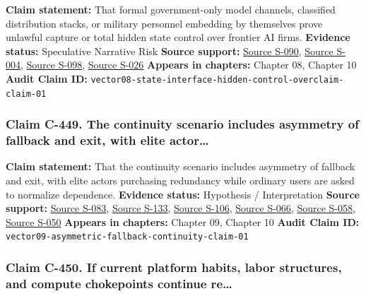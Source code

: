 \documentclass[
  american,
  11pt,
  letterpaper,
]{article}
\begin{document}
\textbf{Claim statement:} That formal government-only model channels,
classified distribution stacks, or military personnel embedding by
themselves prove unlawful capture or total hidden state control over
frontier AI firms. \textbf{Evidence status:} Speculative Narrative Risk
\textbf{Source support:}
\hyperref[source-s-090-introducing-openai-for-government]{Source S-090},
\hyperref[source-s-004-claude-gov-models-for-u-s-national-security-customers]{Source
S-004},
\hyperref[source-s-098-anthropic-and-palantir-partner-to-bring-claude-ai-models-to-aws-for-u-s-government-intelligence-and-defense-operations]{Source
S-098},
\hyperref[source-s-026-army-launches-detachment-201-executive-innovation-corps-to-drive-tech-transformation]{Source
S-026} \textbf{Appears in chapters:} Chapter 08, Chapter 10
\textbf{Audit Claim ID:}
\texttt{vector08-state-interface-hidden-control-overclaim-claim-01}

\subsubsection{Claim C-449. The continuity scenario includes asymmetry
of fallback and exit, with elite
actor\ldots{}}\label{claim-c-449-the-continuity-scenario-includes-asymmetry-of-fallback-and-exit-with-elite-actor}

\textbf{Claim statement:} That the continuity scenario includes
asymmetry of fallback and exit, with elite actors purchasing redundancy
while ordinary users are asked to normalize dependence. \textbf{Evidence
status:} Hypothesis / Interpretation \textbf{Source support:}
\hyperref[source-s-083-sam-altman-s-manifest-destiny]{Source S-083},
\hyperref[source-s-133-inside-mark-zuckerbergs-top-secret-hawaii-compound]{Source
S-133},
\hyperref[source-s-106-mark-zuckerberg-downplays-his-5-000-square-foot-underground-bunker-in-hawaii-just-a-little-shelter]{Source
S-106},
\hyperref[source-s-066-why-silicon-valley-billionaires-are-prepping-for-the-apocalypse-in-new-zealand]{Source
S-066},
\hyperref[source-s-058-new-zealand-woos-the-wealthy-with-golden-visa-changes]{Source
S-058},
\hyperref[source-s-050-the-digital-sovereignty-imperative]{Source S-050}
\textbf{Appears in chapters:} Chapter 09, Chapter 10 \textbf{Audit Claim
ID:} \texttt{vector09-asymmetric-fallback-continuity-claim-01}

\subsubsection{Claim C-450. If current platform habits, labor
structures, and compute chokepoints continue
re\ldots{}}\label{claim-c-450-if-current-platform-habits-labor-structures-and-compute-chokepoints-continue-re}
\end{document}
